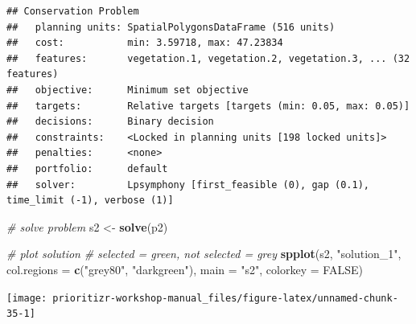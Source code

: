\documentclass[12pt,]{book}
\newenvironment{Shaded}{\begin{snugshade}}{\end{snugshade}}
\newcommand{\KeywordTok}[1]{\textcolor[rgb]{0.13,0.29,0.53}{\textbf{#1}}}
\newcommand{\DataTypeTok}[1]{\textcolor[rgb]{0.13,0.29,0.53}{#1}}
\newcommand{\FloatTok}[1]{\textcolor[rgb]{0.00,0.00,0.81}{#1}}
\newcommand{\StringTok}[1]{\textcolor[rgb]{0.31,0.60,0.02}{#1}}
\newcommand{\CommentTok}[1]{\textcolor[rgb]{0.56,0.35,0.01}{\textit{#1}}}
\newcommand{\OtherTok}[1]{\textcolor[rgb]{0.56,0.35,0.01}{#1}}
\newcommand{\OperatorTok}[1]{\textcolor[rgb]{0.81,0.36,0.00}{\textbf{#1}}}
\newcommand{\NormalTok}[1]{#1}
\begin{document}
\begin{Shaded}
\end{Shaded}

\begin{verbatim}
## Conservation Problem
##   planning units: SpatialPolygonsDataFrame (516 units)
##   cost:           min: 3.59718, max: 47.23834
##   features:       vegetation.1, vegetation.2, vegetation.3, ... (32 features)
##   objective:      Minimum set objective 
##   targets:        Relative targets [targets (min: 0.05, max: 0.05)]
##   decisions:      Binary decision 
##   constraints:    <Locked in planning units [198 locked units]>
##   penalties:      <none>
##   portfolio:      default
##   solver:         Lpsymphony [first_feasible (0), gap (0.1), time_limit (-1), verbose (1)]
\end{verbatim}

\begin{Shaded}
\begin{Highlighting}[]
\CommentTok{# solve problem}
\NormalTok{s2 <-}\StringTok{ }\KeywordTok{solve}\NormalTok{(p2)}

\CommentTok{# plot solution}
\CommentTok{# selected = green, not selected = grey}
\KeywordTok{spplot}\NormalTok{(s2, }\StringTok{"solution_1"}\NormalTok{, }\DataTypeTok{col.regions =} \KeywordTok{c}\NormalTok{(}\StringTok{"grey80"}\NormalTok{, }\StringTok{"darkgreen"}\NormalTok{), }\DataTypeTok{main =} \StringTok{"s2"}\NormalTok{,}
       \DataTypeTok{colorkey =} \OtherTok{FALSE}\NormalTok{)}
\end{Highlighting}
\end{Shaded}

\begin{center}\texttt{[image: prioritizr-workshop-manual\_files/figure-latex/unnamed-chunk-35-1]} \end{center}
\end{document}
